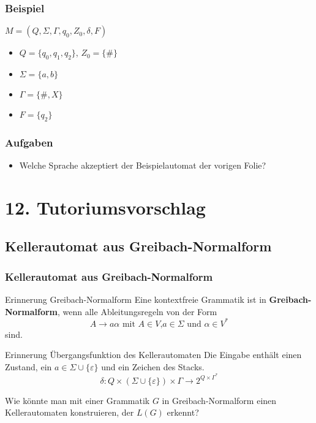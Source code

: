 \documentclass{beamer}
\begin{document}
{\begin{frame}
\frametitle{Beispiel}
$M = (Q, \Sigma, \Gamma, q_0, Z_0, \delta, F)$
\begin{itemize}
\item $Q = \{q_0, q_1, q_2\}$, $Z_0 = \{\#\}$
\item $\Sigma = \{a,b\}$
\item $\Gamma = \{\#,X\}$
\item $F = \{q_2\}$
\end{itemize}
\begin{figure}
\end{figure}
\end{frame}

\begin{frame}
\frametitle{Aufgaben}
\begin{itemize}
\item Welche Sprache akzeptiert der Beispielautomat der vorigen Folie?
\end{itemize}
\end{frame}

}
%

\section{12. Tutoriumsvorschlag}
\subsection{Kellerautomat aus Greibach-Normalform}
\begin{frame}
 \frametitle{Kellerautomat aus Greibach-Normalform}
 \begin{block}{Erinnerung Greibach-Normalform}
  Eine kontextfreie Grammatik ist in \textbf{Greibach-Normalform}, wenn alle Ableitungsregeln von der Form   
  \[ A \rightarrow a\alpha \text{ mit } A \in V\text{,} a\in \Sigma \text{ und } \alpha \in V^*\]
  sind.
 \end{block}
 \pause
 \begin{block}{Erinnerung Übergangsfunktion des Kellerautomaten}
 Die Eingabe enthält einen Zustand, ein $a \in \Sigma \cup \{\varepsilon\}$ und ein Zeichen des Stacks.
 \[\delta : Q \times ( \Sigma \cup \{\varepsilon\}) \times \Gamma \rightarrow 2^{Q \times \Gamma^*}\]
 \vspace{-0.5cm}
 \end{block}
 \pause
 Wie könnte man mit einer Grammatik $G$ in Greibach-Normalform einen Kellerautomaten konstruieren, der $L(G)$ erkennt?
\end{frame}
\end{document}

